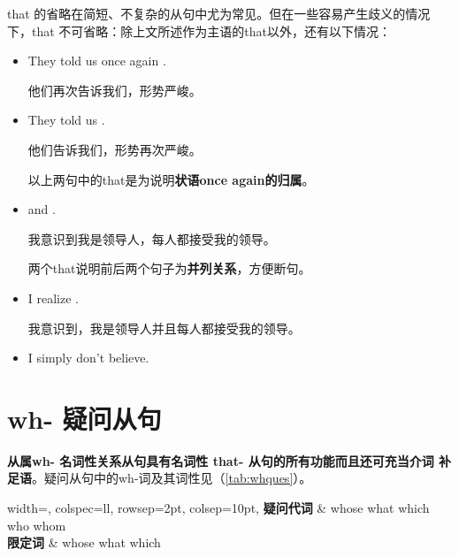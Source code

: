 that 的省略在简短、不复杂的从句中尤为常见。但在一些容易产生歧义的情况
下，that 不可省略：除上文所述作为主语的that以外，还有以下情况：
\begin{itemize}
\item  They told us once again .

  他们再次告诉我们，形势严峻。

\item They told us .

  他们告诉我们，形势再次严峻。

  以上两句中的that是为说明\textbf{状语once again的归属}。

\item {} and .

  我意识到我是领导人，每人都接受我的领导。

  两个that说明前后两个句子为\textbf{并列关系}，方便断句。

\item I realize .

  我意识到，我是领导人并且每人都接受我的领导。

\item {} I simply don't believe.

\end{itemize}

\section{wh- 疑问从句}

\textbf{从属wh- 名词性关系从句具有名词性 that- 从句的所有功能而且还可充当介词
  补足语}。疑问从句中的wh-词及其词性见（\cref{tab:whques}）。

\begin{table}[htbp!]
  \centering \small
  \begin{talltblr}[ caption = {疑问句与疑问从句的wh- 词及其词性},
    label = {tab:whques},
    ]{
      width=\linewidth, colspec={ll},
      rowsep=2pt, colsep=10pt,
    }
    \toprule
    \textbf{疑问代词} &  whose \quad what \quad which \quad who \quad whom \\
    \textbf{限定词} & whose \quad what \quad which \\
    \bottomrule
  \end{talltblr}%
\end{table}

